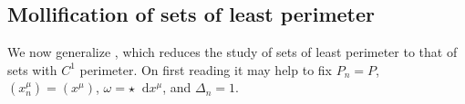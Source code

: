\documentclass[reqno,12pt,letterpaper]{amsart}
\newcommand*\dif{\mathop{}\!\mathrm{d}}
\newtheorem{sublemma}[theorem]{Sublemma}
\theoremstyle{definition}
\numberwithin{equation}{section}
\begin{document}


\subsection{Mollification of sets of least perimeter}
We now generalize \cite[Lemma 7.5]{Giusti77}, which reduces the study of sets of least perimeter to that of sets with $C^1$ perimeter.
On first reading it may help to fix $P_n = P$, $(x^\mu_n) = (x^\mu)$, $\omega = \star \dif x^\mu$, and $\Delta_n = 1$.
\end{document}
